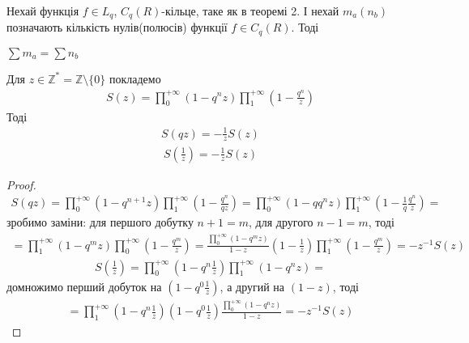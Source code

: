 \documentclass[12pt,a4paper]{article}
\begin{document}
\vspace{1,5cm}

\begin{thm}
Нехай функція $f\in L_{q}$, $C_{q}(R)$-кільце, таке як в теоремі 2. І нехай $m_{a}(n_{b})$ позначають кількість нулів(полюсів) функції $f \in C_{q}(R)$. Тоді 
\begin{center}
$\sum m_{a}=\sum n_{b}$
\end{center}
\end{thm}

\vspace{1,5cm}

\begin{twerd} Для $z \in \mathbb{Z}^{*}=\mathbb{Z}\setminus \lbrace 0 \rbrace$\label{{Z}^{*}} покладемо
\[\begin{array}{l} 
 S(z)= \prod\limits_{0}^{+\infty } ( 1-q^{n}z ) \prod\limits_{1}^{+\infty }( 1-\frac{q^{n}}{z})
 \end{array}\]\label{S(z)}
Тоді
\begin{equation}\label{s1}
\begin{array}{l}
   S(qz)=-\frac{1}{z}S(z)
 \end{array}
\end{equation}  
\begin{equation}\label{s2}
\begin{array}{l}        
   S(\frac{1}{z})= -\frac{1}{z}S(z)
\end{array}
\end{equation}
\end{twerd}
\begin{proof}
\[\begin{array}{l} 
S(qz)= \prod\limits_{0}^{+\infty } ( 1-q^{n+1}z ) \prod\limits_{1}^{+\infty }( 1-\frac{q^{n}}{qz})=
 \prod\limits_{0}^{+\infty } ( 1-qq^{n}z ) \prod\limits_{1}^{+\infty }( 1-\frac{1}{q}\frac{q^{n}}{z})=
 \end{array}\]
зробимо заміни: для першого добутку $n+1=m$, для другого $n-1=m$, тоді 
\[\begin{array}{l} 
 =\prod\limits_{1}^{+\infty } ( 1-q^{m}z ) \prod\limits_{0}^{+\infty }( 1-\frac{q^{m}}{z})=\frac{\prod\limits_{0}^{+\infty } ( 1-q^{m}z )}{1-z}(1-\frac{1}{z})\prod\limits_{1}^{+\infty }( 1-\frac{q^{m}}{z})=-z^{-1}S(z)
\end{array}\]
\[\begin{array}{l} 
 S(\frac{1}{z})= \prod\limits_{0}^{+\infty } ( 1-q^{n}\frac{1}{z} ) \prod\limits_{1}^{+\infty }( 1-q^{n}z)=
\end{array}\]
домножимо перший добуток на $(1-q^{0}\frac{1}{z})$, а другий на $(1-z)$, тоді 
\[\begin{array}{l} 
  =\prod\limits_{1}^{+\infty } ( 1-q^{n}\frac{1}{z} )(1-q^{0}\frac{1}{z})\frac{    \prod\limits_{0}^{+\infty }( 1-q^{n}z)}{1-z}=-z^{-1}S(z)
 \end{array}\]
\end{proof}
\vspace{1,5cm}
\end{document}
